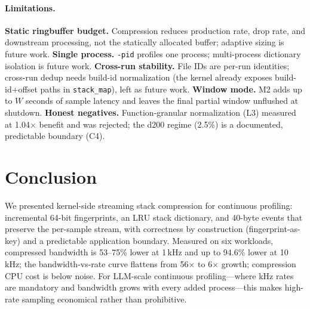 \documentclass[letterpaper,twocolumn,10pt]{article}
\begin{document}
\paragraph{Limitations.}
\textbf{Static ringbuffer budget.} Compression reduces production rate,
drop rate, and downstream processing, not the statically allocated
buffer; adaptive sizing is future work. \textbf{Single process.}
\texttt{-pid} profiles one process; multi-process dictionary isolation is
future work. \textbf{Cross-run stability.} File IDs are per-run
identities; cross-run dedup needs build-id normalization (the kernel
already exposes build-id+offset paths in \texttt{stack\_map}), left as
future work. \textbf{Window mode.} M2 adds up to $W$ seconds of sample latency and
leaves the final partial window unflushed at shutdown. \textbf{Honest
negatives.} Function-granular
normalization (L3) measured at 1.04$\times$ benefit and was rejected; the
d200 regime (2.5\%) is a documented, predictable boundary (C4).

\section{Conclusion}
We presented kernel-side streaming stack compression for continuous
profiling: incremental 64-bit fingerprints, an LRU stack dictionary, and
40-byte events that preserve the per-sample stream, with correctness by
construction (fingerprint-as-key) and a predictable application boundary.
Measured on six workloads, compressed bandwidth is 53--75\% lower at
1\,kHz and up to 94.6\% lower at 10\,kHz; the bandwidth-vs-rate curve
flattens from 56$\times$ to 6$\times$ growth; compression CPU cost is
below noise. For LLM-scale continuous profiling---where kHz rates are
mandatory and bandwidth grows with every added process---this makes
high-rate sampling economical rather than prohibitive.
\end{document}
